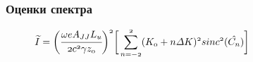 \documentclass[14pt, hyperref = {colorlinks},xcolor=table ]{beamer}
\begin{document}
\small
\begin{frame}
\frametitle{Оценки спектра}\label{t1}
\vspace{-5pt}
\begin{figure}[h]
\begin{minipage}[h]{0.49\linewidth}
	\vspace{-10pt}
\end{minipage}	

\end{figure}
\vspace{-15pt}
\begin{figure}[h]
$\mathnormal{{\widetilde{I}} =
	\bigg(\cfrac{\omega eA_{JJ}L_u}{2c^2 \gamma z_0}\bigg)^2\bigg[
	\displaystyle\sum\limits_{n =-2}^{2}(K_0 + n\Delta K)^2sinc^2(\hat{C_n})}\bigg]$\\

\end{figure}
\end{frame}
\end{document}
